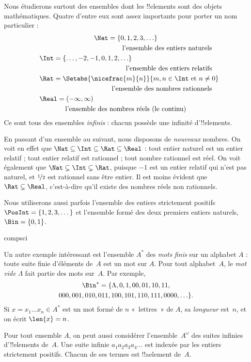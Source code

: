 \documentclass[../../../include/open-logic-section]{subfiles}
\begin{document}

\begin{ex}
Nous étudierons surtout des ensembles dont les !!{element}s sont
des objets mathématiques. Quatre d'entre eux sont assez importants
pour porter un nom particulier :
\begin{multline*}
    \Nat = \{0, 1, 2, 3, \ldots\} \\
    \shoveright{\text{l'ensemble des entiers naturels}}\\
    \shoveleft{\Int = \{\ldots, -2, -1, 0, 1, 2, \ldots\}} \\
    \shoveright{\text{l'ensemble des entiers relatifs}}\\
    \shoveleft{\Rat = \Setabs{\nicefrac{m}{n}}{m, n \in \Int\text{ et }n \neq 0}}\\
    \shoveright{\text{l'ensemble des nombres rationnels}}\\
    \shoveleft{\Real = (-\infty, \infty)}\\
    \text{l'ensemble des nombres réels (le continu)}
\end{multline*}
Ce sont tous des ensembles \emph{infinis} : chacun possède une
infinité d'!!{element}s.

En passant d'un ensemble au suivant, nous disposons de
\emph{nouveaux} nombres. On voit en effet que
$\Nat \subseteq \Int \subseteq \Rat \subseteq \Real$ :
tout entier naturel est un entier relatif ; tout entier relatif
est rationnel ; tout nombre rationnel est réel.
On voit également que $\Nat \subsetneq \Int \subsetneq \Rat$,
puisque $-1$ est un entier relatif qui n'est pas naturel, et
$\nicefrac{1}{2}$ est rationnel sans être entier.
Il est moins évident que $\Rat \subsetneq \Real$, c'est-à-dire
qu'il existe des nombres réels non rationnels.

Nous utiliserons aussi parfois l'ensemble des entiers strictement
positifs $\PosInt = \{1, 2, 3, \dots\}$ et l'ensemble formé
des deux premiers entiers naturels, $\Bin = \{0, 1\}$.
\end{ex}

\begin{tagblock}{compsci}
\begin{ex}[Mots]
Un autre exemple intéressant est l'ensemble $A^{*}$ des
\emph{mots finis} sur un alphabet $A$ : toute suite finie
d'éléments de~$A$ est un mot sur $A$. Pour tout alphabet~$A$,
le \emph{mot vide $\Lambda$} fait partie des mots sur~$A$.
Par exemple,
\begin{multline*}
\Bin^*
=\{\Lambda,0,1,00,01,10,11,\\
000,001,010,011,100,101,110,111,0000,\ldots\}.
\end{multline*}
Si $x=x_{1}\ldots x_{n}\in A^{*}$ est un mot formé de $n$
«~lettres~» de $A$, sa \emph{longueur} est~$n$,
et on écrit $\len{x}=n$.
\end{ex}
\end{tagblock}

\begin{ex}
Pour tout ensemble $A$, on peut aussi considérer l'ensemble~$A^\omega$
des suites infinies d'!!{element}s de~$A$. Une suite infinie
$a_1a_2a_3a_4\dots$ est indexée par les entiers strictement positifs.
Chacun de ses termes est !!a{element} de~$A$.
%
\end{ex}
\end{document}
